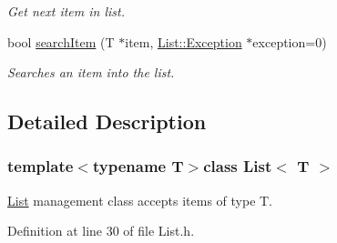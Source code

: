 \begin{DoxyCompactItemize}
\begin{DoxyCompactList}\small\item\em Get next item in list. \end{DoxyCompactList}\item 
bool \hyperlink{class_list_a3abe5f37252ca9b6d11c7fff6ff94f35}{search\-Item} (T $\ast$item, \hyperlink{class_list_af1ab8d5d6d02ed4b4034247619c7119e}{List\-::\-Exception} $\ast$exception=0)
\begin{DoxyCompactList}\small\item\em Searches an item into the list. \end{DoxyCompactList}\end{DoxyCompactItemize}


\subsection{Detailed Description}
\subsubsection*{template$<$typename T$>$class List$<$ T $>$}

\hyperlink{class_list}{List} management class accepts items of type T. 

Definition at line 30 of file List.\-h.



